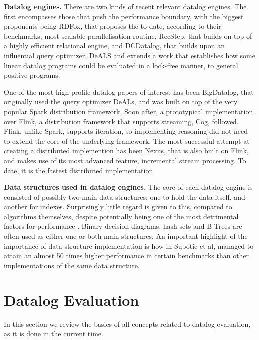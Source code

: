 \documentclass[manuscript,screen,review]{acmart}
\theoremstyle{definition}
\begin{document}
\textbf{Datalog engines.} There are two kinds of recent relevant datalog engines. The first encompasses
those that push the performance boundary, with the biggest proponents being RDFox\cite{rdfox}, that
proposes the to-date, according to their benchmarks, most scalable parallelisation routine, RecStep\cite{recstep},
that builds on top of a highly efficient relational engine, and DCDatalog\cite{dcdatalog}, that builds upon
an influential query optimizer, DeALS\cite{deals} and extends a work that establishes how some linear
datalog programs could be evaluated in a lock-free manner, to general positive programs.

One of the most high-profile datalog papers of interest has been BigDatalog\cite{bigdatalog}, that
originally used the query optimizer DeALs, and was built on top of the very popular Spark\cite{spark}
distribution framework. Soon after, a prototypical implementation\cite{cog} over Flink\cite{flink},
a distribution framework that supports streaming, Cog, followed. Flink, unlike Spark, supports
iteration, so implementing reasoning did not need to extend the core of the underlying framework. The most
successful attempt at creating a distributed implemention has been Nexus\cite{nexus}, that is also built on Flink,
and makes use of its most advanced feature, incremental stream processing. To date, it is the fastest distributed
implementation.

\textbf{Data structures used in datalog engines.} The core of each datalog engine is consisted of possibly
two main data structures: one to hold the data itself, and another for indexes. Surprisingly little regard is given to
this, compared to algorithms themselves, despite potentially being one of the most detrimental factors for performance
. Binary-decision diagrams\cite{bddbddb}, hash sets\cite{microzee} and B-Trees\cite{souffle_btree} are often used as
either one or both main structures. An important highlight of the importance of data structure implementation is how
in \cite{souffle_btree} Subotic et al, managed to attain an almost 50 times higher performance in certain benchmarks
than other implementations of the same data structure.

\section{Datalog Evaluation}

In this section we review the basics of all concepts related to datalog evaluation, as it is done in the current time.
\end{document}
